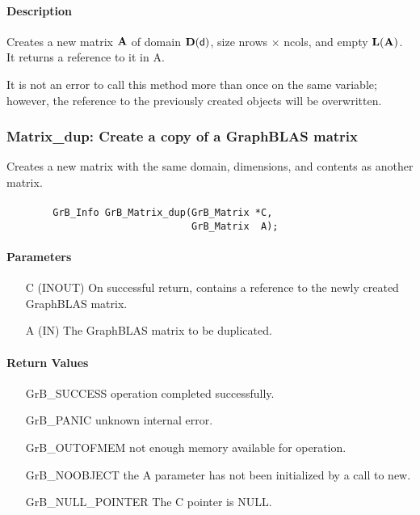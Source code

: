 \paragraph{Description}

Creates a new matrix ${\bf A}$ of domain $\bold{D}({\sf d})$, size 
{\sf nrows $\times$ ncols}, and empty $\bold{L}({\bf A})$. It returns a
reference to it in {\sf A}.

It is not an error to call this method more than once on the same variable;  
however, the reference to the previously created objects will be overwritten. 

\subsubsection{{\sf Matrix\_dup}: Create a copy of a GraphBLAS matrix}

Creates a new matrix with the same domain, dimensions, and contents as 
another matrix.

\paragraph{\syntax}

\begin{verbatim}
        GrB_Info GrB_Matrix_dup(GrB_Matrix *C,
                                GrB_Matrix  A);
\end{verbatim}

\paragraph{Parameters}

\begin{itemize}[leftmargin=1.1in]
    \item[{\sf C}] ({\sf INOUT}) On successful return, contains a reference to 
                                 the newly created GraphBLAS matrix.
    \item[{\sf A}] ({\sf IN})    The GraphBLAS matrix to be duplicated.
\end{itemize}


\paragraph{Return Values}

\begin{itemize}[leftmargin=2.1in]
\item[{\sf GrB\_SUCCESS}]   operation completed successfully.
\item[{\sf GrB\_PANIC}]     unknown internal error.
\item[{\sf GrB\_OUTOFMEM}]  not enough memory available for operation.
\item[{\sf GrB\_NOOBJECT}]   the {\sf A} parameter has not been initialized by a
                             call to {\sf new}.
\item[{\sf GrB\_NULL\_POINTER}]   The {\sf C} pointer is {\sf NULL}.
\end{itemize}


